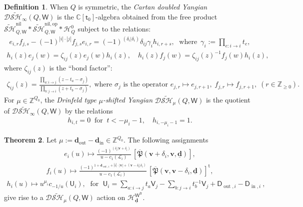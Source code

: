 \documentclass[10pt]{amsart}
\theoremstyle{definition}
\newtheorem{Theorem}{Theorem}[section]
\newtheorem{Definition}[Theorem]{Definition}
\numberwithin{equation}{section}
\newcommand{\bC}{\mathbb{C}}
\newcommand{\bZ}{\mathbb{Z}}
\newcommand{\bv}{\mathbf{v}}
\newcommand{\bd}{\mathbf{d}}
\newcommand{\sW}{\mathsf{W}}
\newcommand{\In}{\operatorname{in}}
\newcommand{\Out}{\operatorname{out}}
\begin{document}
\begin{Definition}
\label{def shifted yangian}
When $Q$ is symmetric, the \textit{Cartan doubled Yangian} $\mathcal D\widetilde{\mathcal{SH}}_\infty(Q,\sW)$ is the $\bC[\mathsf t_0]$-algebra obtained from the free product $\widetilde{\mathcal{SH}}^{\mathrm{nil}}_{Q,\sW}*\widetilde{\mathcal{SH}}^{\mathrm{nil},\mathrm{op}}_{Q,\sW}*\mathcal H^0_{Q}$ subject to the relations: 
\begin{align}\label{ef rel_sym}
    e_{i,r} f_{j,s}-(-1)^{|i|\cdot|j|}f_{j,s}e_{i,r}=(-1)^{(\delta_i|\delta_i)}\delta_{ij}\gamma_i h_{i,r+s},\,\,\;\text{where }\,\gamma_i:=\prod_{e:i\to i}t_e,
\end{align}
\begin{align}\label{he and hf rel_sym}
h_i(z)e_j(w)=\zeta_{ij}(z)e_j(w)h_i(z),\quad h_i(z)f_j(w)=\zeta_{ij}(z)^{-1}f_j(w)h_i(z),
\end{align}
where $\zeta_{ij}(z)$ is the ``bond factor'':
\begin{align}\label{bond fac}
    \zeta_{ij}(z)=\frac{\prod_{a:i\to j}(z-t_a-\sigma_j)}{\prod_{b:j\to i}(z+t_b-\sigma_j)},\;\text{where $\sigma_j$ is the operator } e_{j,r}\mapsto e_{j,r+1},\; f_{j,r}\mapsto f_{j,r+1},\;(r\in \bZ_{\geqslant0}).
\end{align}
For $\mu\in \bZ^{Q_0}$,  the \textit{Drinfeld type} $\mu$\textit{-shifted Yangian} $\mathcal D\widetilde{\mathcal{SH}}_\mu(Q,\sW)$ is the quotient of $\mathcal D\widetilde{\mathcal{SH}}_\infty(Q,\sW)$ by the relations
\begin{align}\label{h shift}
    h_{i,t}=0\:\text{ for }\:t<-\mu_i-1,\quad h_{i,-\mu_i-1}=1.
\end{align}
\end{Definition}

\begin{Theorem}\label{cor shifted yangian action}
Let $\mu:=\bd_{\Out}-\bd_{\In}\in \bZ^{Q_0}$. The following assignments 
\begin{align}\label{sph coha act_sym}
    e_i(u)\mapsto \frac{(-1)^{(\delta_i|\bv+\delta_i)}}{u-c_1(\mathcal L_i)}\,[\overline{\mathfrak{P}}(\bv+\delta_i,\bv,\underline{\bd})],
\end{align}
\begin{align}\label{sph coha op act_sym}
    f_i(u)\mapsto \frac{(-1)^{1+\bd_{\Out,i}+|i|\cdot |\bv|+(\bv-\delta_i|\delta_i)}}{u-c_1(\mathcal L_i)}\,[\overline{\mathfrak{P}}(\bv,\bv-\delta_i,\underline{\bd})]^{\mathrm{t}},
\end{align}
\begin{align}\label{cartan act_sym}
    h_i(u)\mapsto u^{\mu_i}c_{-1/u}\left(\mathsf U_i\right),\;\text{ for }\; \mathsf U_i=\sum_{a:i\to j}t_a\mathsf V_j-\sum_{b:j\to i}t_{b}^{-1}\mathsf V_j+\mathsf D_{\Out,i}-\mathsf D_{\In,i}\:,
\end{align}
give rise to a $\mathcal D\widetilde{\mathcal{SH}}_\mu(Q,\sW)$ action on $\mathcal H_{\underline{\bd}}^{\sW^{\mathrm{fr}}}$.
\end{Theorem}
\end{document}

